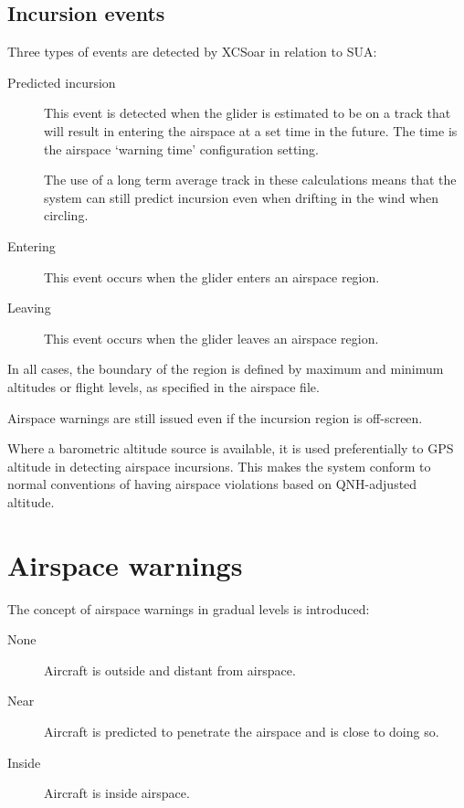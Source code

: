 \subsection*{Incursion events}

Three types of events are detected by XCSoar in relation to SUA:
\begin{description}
\item[Predicted incursion] This event is detected when the glider is estimated
to be on a track that will result in entering the airspace at a set
time in the future.  The time is the airspace `warning time'
configuration setting.

The use of a long term average track in these calculations means that
the system can still predict incursion even when drifting in the wind
when circling.


\item[Entering] This event occurs when the glider enters an airspace region.
\item[Leaving] This event occurs when the glider leaves an airspace region.
\end{description}
In all cases, the boundary of the region is defined by maximum and
minimum altitudes or flight levels, as specified in the airspace file.

Airspace warnings are still issued even if the incursion region is
off-screen.

Where a barometric altitude source is available, it is used
preferentially to GPS altitude in detecting airspace incursions.  This
makes the system conform to normal conventions of having airspace
violations based on QNH-adjusted altitude.


\section{Airspace warnings}

The concept of airspace warnings in gradual levels is introduced:
\begin{description}
\item[None] Aircraft is outside and distant from airspace.
\item[\colorbox{AirspaceYellow}{Near}] Aircraft is predicted to penetrate the airspace and 
  is close to doing so.
\item[\colorbox{AirspaceRed}{Inside}] Aircraft is inside airspace.
\end{description}

